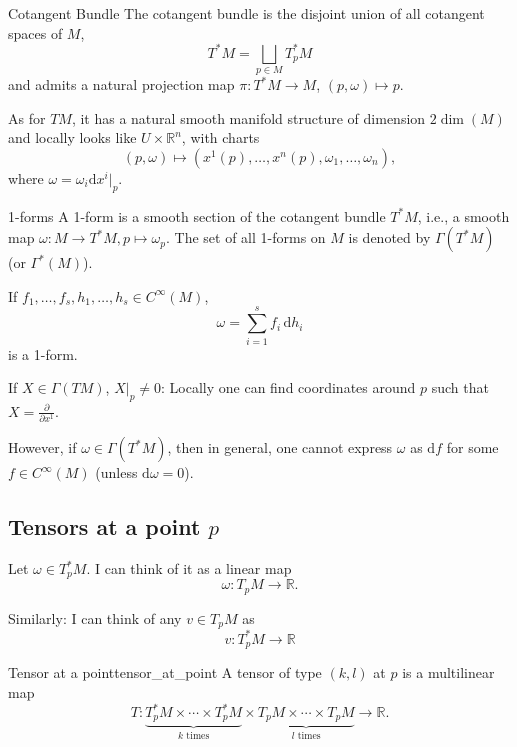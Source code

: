 \begin{colordef}{Cotangent Bundle}{}
The cotangent bundle is the disjoint union of all cotangent spaces of $M$,
\[
T^*M = \bigsqcup_{p \in M} T_p^* M
\]
and admits a natural projection map $\pi:T^*M \to M$, $(p,\omega) \mapsto p$.
\end{colordef}

As for $TM$, it has a natural smooth manifold structure of dimension $2\dim(M)$ and locally looks like $U \times \mathbb{R}^n$, with charts 
$$(p, \omega) \mapsto (x^1(p), \dots, x^n(p), \omega_1, \dots, \omega_n),$$ 
where $\omega = \omega_i \mathrm{d}x^i|_p.$


\begin{colordef}{1-forms}{}
A 1-form is a smooth section of the cotangent bundle $T^*M$, i.e., a smooth map $\omega: M \to T^*M,p\mapsto \omega_p$. The set of all 1-forms on $M$ is denoted by $\Gamma(T^*M)$ (or $\Gamma^*(M)$).
\end{colordef}

\begin{colexample}{}{}
If $f_1, \ldots, f_s, h_1, \ldots, h_s \in C^\infty(M)$,
\[
\omega = \sum_{i=1}^{s} f_i \, \mathrm{d}h_i
\]
is a 1-form.
\end{colexample}

\begin{colremark}
If $X \in \Gamma(TM)$, $X|_p \neq 0$: Locally one can find coordinates around $p$ such that $X = \frac{\partial}{\partial x^1}$.

However, if $\omega \in \Gamma(T^*M)$, then in general, one cannot express $\omega$ as $\mathrm{d}f$ for some $f \in C^\infty(M)$ (unless $\mathrm{d}\omega = 0$).
\end{colremark}




\subsection{Tensors at a point $p$}

Let $\omega \in T_p^* M$. I can think of it as a linear map
\[
\omega: T_p M \longrightarrow \mathbb{R}.
\]

Similarly: I can think of any $v \in T_p M$ as
\[
v: T_p^* M \longrightarrow \mathbb{R}
\]

\begin{colordef}{Tensor at a point}{tensor_at_point}
A tensor of type $(k, l)$ at $p$ is a multilinear map
\[
T: \underbrace{T_p^* M \times \cdots \times T_p^* M}_{k \text{ times}} \times \underbrace{T_p M \times \cdots \times T_p M}_{l \text{ times}} \longrightarrow \mathbb{R}.
\]
\end{colordef}


